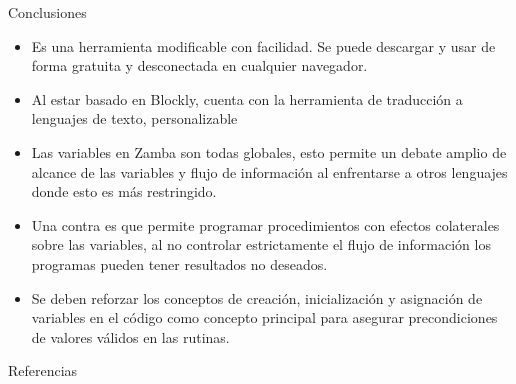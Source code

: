 \documentclass[final]{beamer}
\newlength{\twocolwid}
\begin{document}
\begin{frame}[t]
\begin{columns}[t]
\begin{column}{\twocolwid}

\begin{block}{Conclusiones}
    \begin{itemize}
        \item Es una herramienta modificable con facilidad. Se puede descargar y usar de forma gratuita y desconectada en cualquier navegador.
        \item Al estar basado en Blockly, cuenta con la herramienta de traducción a lenguajes de texto, personalizable
        \item Las variables en Zamba son todas globales, esto permite un debate amplio de alcance de las variables y flujo de información al enfrentarse a otros lenguajes donde esto es más restringido.
        \item Una contra es que permite programar procedimientos con efectos colaterales sobre las variables, al no controlar estrictamente el flujo de información los programas pueden tener resultados no deseados.
        \item Se deben reforzar los conceptos de creación, inicialización y asignación de variables en el código como concepto principal para asegurar precondiciones de valores válidos en las rutinas.
    \end{itemize}
\end{block}

\begin{block}{Referencias}

\nocite{*} %
\small{
\vspace{0.75in}}

\end{block}





\end{column} %

\end{columns} %

\end{frame} %
\end{document}
